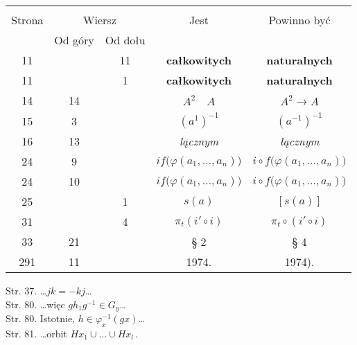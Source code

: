\documentclass[a4paper,11pt]{article}
\begin{document}
\begin{center}

  \begin{tabular}{|c|c|c|c|c|}
    \hline
    & \multicolumn{2}{c|}{} & & \\
    Strona & \multicolumn{2}{c|}{Wiersz} & Jest
                              & Powinno być \\ \cline{2-3}
    & Od góry & Od dołu & & \\
    \hline
    11  & & 11 & \textbf{całkowitych} & \textbf{naturalnych} \\
    11  & &  1 & \textbf{całkowitych} & \textbf{naturalnych} \\
    14  & 14 & & $A^{ 2 } \quad A$ & $A^{ 2 } \to A$ \\
    15  &  3 & & $( a^{ 1 } )^{ -1 }$ & $( a^{ -1 } )^{ -1 }$ \\
    16  & 13 & & \textit{lącznym} & \textit{łącznym} \\
    24  &  9 & & $if\big( \varphi( a_{ 1 }, \ldots, a_{ n } ) \big)$
           & $i \circ f\big( \varphi( a_{ 1 }, \ldots, a_{ n } ) \big)$ \\
    24  & 10 & & $if\big( \varphi( a_{ 1 }, \ldots, a_{ n } ) \big)$
           & $i \circ f\big( \varphi( a_{ 1 }, \ldots, a_{ n } ) \big)$ \\
    25  & &  1 & $s( a )$ & $[ s( a ) ]$ \\
    31  & &  4 & $\pi_{ t }( i' \circ i )$
           & $\pi_{ t } \circ ( i' \circ i )$ \\
    33  & 21 & & \S{} 2 & \S{} 4 \\
    291  & 11 & & 1974. & 1974). \\
    \hline
  \end{tabular}

\end{center}



Str. 37. \ldots$j k = -k j$\ldots \\
Str. 80. \ldots więc $g h_{ 1 } g^{ -1 } \in G_{ y }$\ldots \\
Str. 80. Istotnie, $h \in \varphi_{ x }^{ -1 }( g x )$\ldots \\
Str. 81. \ldots orbit $H x_{ 1 } \cup \ldots \cup H x_{ l } \, .$
\end{document}
